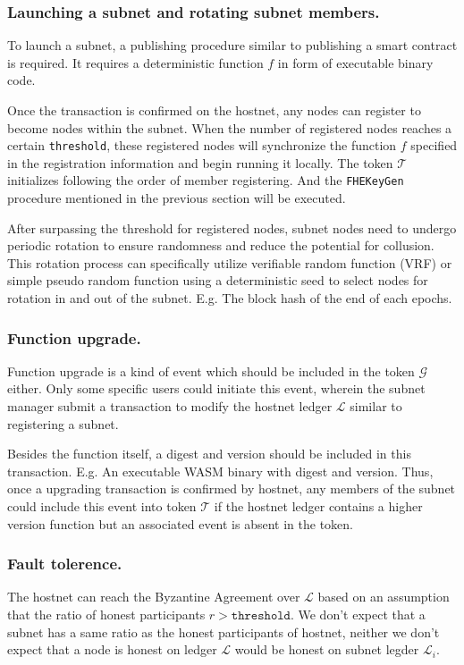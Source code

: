 \documentclass[11pt]{article}
\begin{document}
\subsubsection{Launching a subnet and rotating subnet members.}
To launch a subnet, a publishing procedure similar to publishing a smart contract is required.
It requires a deterministic function $f$ in form of executable binary code.

Once the transaction is confirmed on the hostnet, any nodes can register to become nodes within the subnet.
When the number of registered nodes reaches a certain \texttt{threshold}, these registered nodes will synchronize the function $f$ specified in the registration information and begin running it locally.
The token $\mathcal{T}$ initializes following the order of member registering.
And the \texttt{FHEKeyGen} procedure mentioned in the previous section will be executed.

After surpassing the threshold for registered nodes, subnet nodes need to undergo periodic rotation to ensure randomness and reduce the potential for collusion.
This rotation process can specifically utilize verifiable random function (VRF) or simple pseudo random function using a deterministic seed to select nodes for rotation in and out of the subnet. E.g. The block hash of the end of each epochs.

\subsubsection{Function upgrade.}
Function upgrade is a kind of event which should be included in the token $\mathcal{G}$ either.
Only some specific users could initiate this event, wherein the subnet manager submit a transaction to modify the hostnet ledger $\mathcal{L}$ similar to registering a subnet.

Besides the function itself, a digest and version should be included in this transaction. E.g. An executable WASM binary with digest and version.
Thus, once a upgrading transaction is confirmed by hostnet, any members of the subnet could include this event into token $\mathcal{T}$ if the hostnet ledger contains a higher version function but an associated event is absent in the token.

\subsubsection{Fault tolerence.}
The hostnet can reach the Byzantine Agreement over $\mathcal{L}$ based on an assumption that the ratio of honest participants $r > \texttt{threshold}$.
We don{'}t expect that a subnet has a same ratio as the honest participants of hostnet, neither we don{'}t expect that a node is honest on ledger $\mathcal{L}$ would be honest on subnet legder $\mathcal{L}_{i}$.
\end{document}
